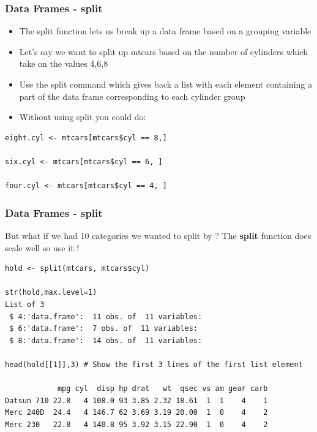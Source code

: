 \documentclass{beamer}
\begin{document}
\begin{frame}[fragile]
\frametitle{Data Frames - split}
\begin{itemize}
\item The split function lets us break up a data frame based on a grouping variable
\item Let's say we want to split up mtcars based on the number of cylinders which take on the values 4,6,8
\item Use the split command which gives back a list with each element containing a part of the data frame corresponding to each cylinder group
\item Without using split you could do:
\end{itemize}
\footnotesize
\begin{verbatim}
eight.cyl <- mtcars[mtcars$cyl == 8,]

six.cyl <- mtcars[mtcars$cyl == 6, ]

four.cyl <- mtcars[mtcars$cyl == 4, ]
\end{verbatim}
\end{frame}

%

\begin{frame}[fragile]
\frametitle{Data Frames - split}
But what if we had 10 categories we wanted to split by ? The \textbf{split} function does scale well so use it !
\footnotesize
\begin{verbatim}
hold <- split(mtcars, mtcars$cyl) 

str(hold,max.level=1)
List of 3
 $ 4:'data.frame':  11 obs. of  11 variables:
 $ 6:'data.frame':	7 obs. of  11 variables:
 $ 8:'data.frame':	14 obs. of  11 variables:

head(hold[[1]],3) # Show the first 3 lines of the first list element 

            mpg cyl  disp hp drat   wt  qsec vs am gear carb
Datsun 710 22.8   4 108.0 93 3.85 2.32 18.61  1  1    4    1
Merc 240D  24.4   4 146.7 62 3.69 3.19 20.00  1  0    4    2
Merc 230   22.8   4 140.8 95 3.92 3.15 22.90  1  0    4    2
\end{verbatim}
\end{frame}

%
\end{document}
